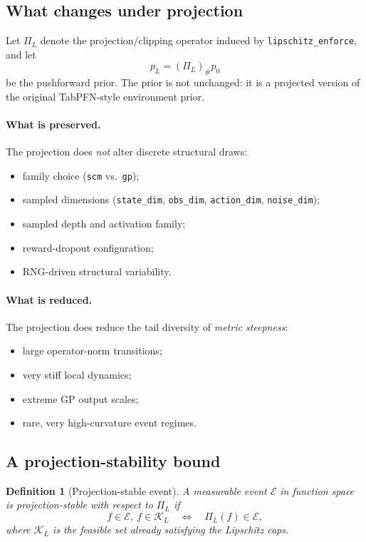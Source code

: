 \documentclass[11pt]{article}
\newtheorem{definition}{Definition}
\newcommand{\1}{\mathbf{1}}
\begin{document}
\subsection{What changes under projection}
Let $\Pi_L$ denote the projection/clipping operator induced by \texttt{lipschitz\_enforce}, and let
\begin{equation}
  p_L = (\Pi_L)_{\#} p_0
\end{equation}
be the pushforward prior. The prior is not unchanged: it is a projected version of the original TabPFN-style environment prior.

\paragraph{What is preserved.}
The projection does \emph{not} alter discrete structural draws:
\begin{itemize}[leftmargin=1.2em]
  \item family choice (\texttt{scm} vs.\ \texttt{gp});
  \item sampled dimensions (\texttt{state\_dim}, \texttt{obs\_dim}, \texttt{action\_dim}, \texttt{noise\_dim});
  \item sampled depth and activation family;
  \item reward-dropout configuration;
  \item RNG-driven structural variability.
\end{itemize}

\paragraph{What is reduced.}
The projection does reduce the tail diversity of \emph{metric steepness}:
\begin{itemize}[leftmargin=1.2em]
  \item large operator-norm transitions;
  \item very stiff local dynamics;
  \item extreme GP output scales;
  \item rare, very high-curvature event regimes.
\end{itemize}

\subsection{A projection-stability bound}
\begin{definition}[Projection-stable event]
A measurable event $\mathcal{E}$ in function space is projection-stable with respect to $\Pi_L$ if
\begin{equation}
  f \in \mathcal{E},\ f \in \mathcal{K}_L
  \quad\Longleftrightarrow\quad
  \Pi_L(f) \in \mathcal{E},
\end{equation}
where $\mathcal{K}_L$ is the feasible set already satisfying the Lipschitz caps.
\end{definition}
\end{document}
